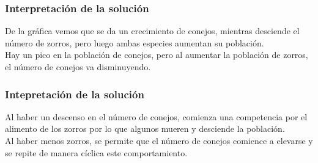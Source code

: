 \begin{frame}
\frametitle{Interpretación de la solución}
De la gráfica vemos que se da un crecimiento de conejos, mientras desciende el número de zorros, pero luego ambas especies aumentan su población.
\\
\bigskip
Hay un pico en la población de conejos, pero al aumentar la población de zorros, el número de conejos va disminuyendo.
\end{frame}
\begin{frame}
\frametitle{Intepretación de la solución}
Al haber un descenso en el número de conejos, comienza una competencia por el alimento de los zorros por lo que algunos mueren y desciende la población.
\\
\bigskip
Al haber menos zorros, se permite que el número de conejos comience a elevarse y se repite de manera cíclica este comportamiento.
\end{frame}

